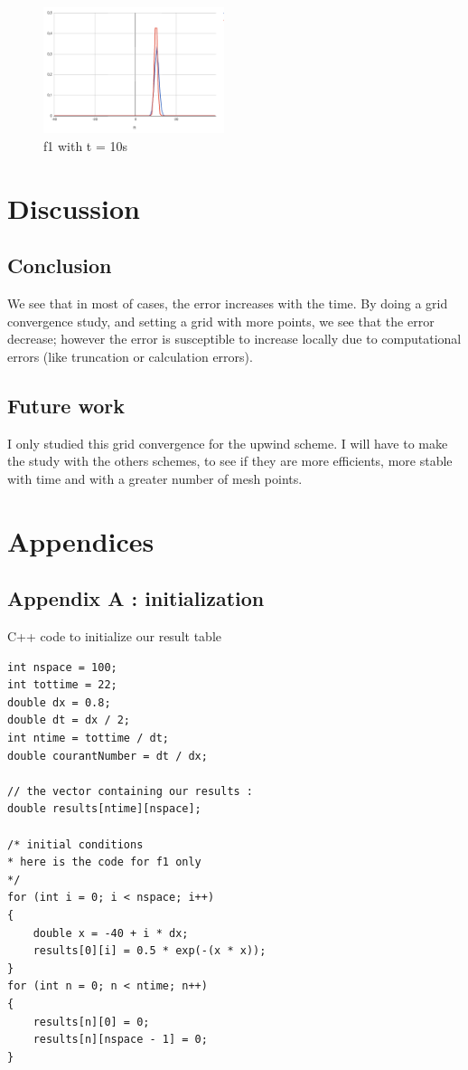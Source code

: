 \documentclass{report}
\begin{document}
                        \begin{figure}[h]
                            \begin{center}
                            \includegraphics[width = 200px]{f1/t10/res.png} 
                            \end{center}
                            \caption{f1 with t = 10s}
                        \end{figure}
                \chapter{Discussion}
                    \section{Conclusion}
                        We see that in most of cases, the error increases with the time.
                        By doing a grid convergence study, and setting a grid with more points, we see that the error decrease; 
                        however the error is susceptible to increase locally due to computational errors (like truncation or calculation errors).
                    \section{Future work}
                        I only studied this grid convergence for the upwind scheme. I will have to make the study with the others schemes,
                        to see if they are more efficients, more stable with time and with a greater number of mesh points.

                \chapter{Appendices}
                \newpage
                    \section{Appendix A : initialization}
                    C++ code to initialize our result table
                    \begin{verbatim}
int nspace = 100;
int tottime = 22;
double dx = 0.8;
double dt = dx / 2;
int ntime = tottime / dt;
double courantNumber = dt / dx;

// the vector containing our results :
double results[ntime][nspace];

/* initial conditions
* here is the code for f1 only
*/
for (int i = 0; i < nspace; i++)
{
    double x = -40 + i * dx;
    results[0][i] = 0.5 * exp(-(x * x));
}
for (int n = 0; n < ntime; n++)
{
    results[n][0] = 0;
    results[n][nspace - 1] = 0;
}
                    \end{verbatim}
\end{document}
